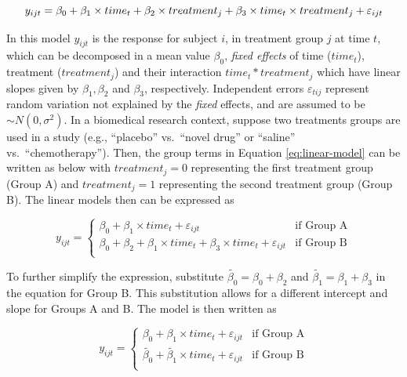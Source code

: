 \documentclass[
]{article}
\begin{document}
\begin{equation}
y_{ijt} = \beta_0+\beta_1 \times time_{t} +\beta_2 \times treatment_{j} +\beta_3 \times time_{t}\times treatment_{j}+\varepsilon_{ijt}\\ 
\label{eq:linear-model}
\end{equation}

In this model \(y_{ijt}\) is the response for subject \(i\), in treatment group \(j\) at time \(t\), which can be decomposed in a mean value \(\beta_0\), \emph{fixed effects} of time (\(time_t\)), treatment (\(treatment_j\)) and their interaction \(time_t*treatment_j\) which have linear slopes given by \(\beta_1, \beta_2\) and \(\beta_3\), respectively. Independent errors \(\varepsilon_{tij}\) represent random variation not explained by the \emph{fixed} effects, and are assumed to be \(\sim N(0,\sigma^2)\).
In a biomedical research context, suppose two treatments groups are used in a study (e.g., ``placebo'' vs.~``novel drug'' or ``saline'' vs.~``chemotherapy''). Then, the group terms in Equation \eqref{eq:linear-model} can be written as below with \(treatment_j=0\) representing the first treatment group (Group A) and \(treatment_j=1\) representing the second treatment group (Group B). The linear models then can be expressed as

\begin{equation}
y_{ijt} = \begin{cases}
\beta_0 + \beta_1\times time_{t}+\varepsilon_{ijt}   & \mbox{if Group A}\\
\beta_0 + \beta_2+\beta_1 \times time_{t} +\beta_3 \times time_{t}+\varepsilon_{ijt}  & \mbox{if Group B}\\
\end{cases}
\label{eq:ANOVA-by-group}
\end{equation}

To further simplify the expression, substitute \(\widetilde{\beta_{0}}=\beta_0+\beta_{2}\) and \(\widetilde{\beta_{1}}=\beta_{1}+\beta_{3}\) in the equation for Group B. This substitution allows for a different intercept and slope for Groups A and B. The model is then written as

\begin{equation}
y_{ijt} = \begin{cases}
\beta_0 + \beta_1\times time_{t}+\varepsilon_{ijt}   & \mbox{if Group A}\\
\widetilde{\beta_{0}} + \widetilde{\beta_1} \times time_{t}+\varepsilon_{ijt}  & \mbox{if Group B}\\
\end{cases}
\label{eq:ANOVA-lines}
\end{equation}
\end{document}

